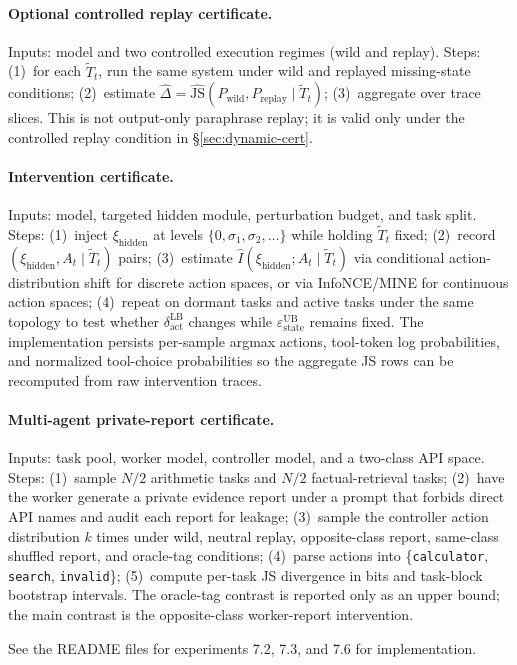   \paragraph{Optional controlled replay certificate.} Inputs: model and two
  controlled execution regimes (wild and replay). Steps: (1)~for each $\tilde
  T_t$, run the same system under wild and replayed missing-state conditions;
  (2)~estimate $\hat\Delta = \hat{\mathrm{JS}}(P_\text{wild}, P_\text{replay}
  \mid \tilde T_t)$; (3)~aggregate over trace slices. This is not output-only
  paraphrase replay; it is valid only under the controlled replay condition in
  \S\ref{sec:dynamic-cert}.

  \paragraph{Intervention certificate.} Inputs: model, targeted hidden module,
  perturbation budget, and task split. Steps: (1)~inject $\xi_\text{hidden}$ at
  levels $\{0, \sigma_1, \sigma_2, \ldots\}$ while holding $\tilde T_t$ fixed;
  (2)~record $(\xi_\text{hidden}, A_t \mid \tilde T_t)$ pairs; (3)~estimate
  $\hat I(\xi_\text{hidden}; A_t \mid \tilde T_t)$ via conditional
  action-distribution shift for discrete action spaces, or via InfoNCE/MINE for
  continuous action spaces; (4)~repeat on dormant tasks and active tasks under
  the same topology to test whether $\delta_\text{act}^\text{LB}$ changes while
  $\varepsilon_\text{state}^\text{UB}$ remains fixed. The implementation
  persists per-sample argmax actions, tool-token log probabilities, and
  normalized tool-choice probabilities so the aggregate JS rows can be
  recomputed from raw intervention traces.

  \paragraph{Multi-agent private-report certificate.} Inputs: task pool, worker
  model, controller model, and a two-class API space. Steps: (1)~sample $N/2$
  arithmetic tasks and $N/2$ factual-retrieval tasks; (2)~have the worker
  generate a private evidence report under a prompt that forbids direct API
  names and audit each report for leakage; (3)~sample the controller action
  distribution $k$ times under wild, neutral replay, opposite-class report,
  same-class shuffled report, and oracle-tag conditions; (4)~parse actions into
  \{\texttt{calculator}, \texttt{search}, \texttt{invalid}\}; (5)~compute
  per-task JS divergence in bits and task-block bootstrap intervals. The
  oracle-tag contrast is reported only as an upper bound; the main contrast is
  the opposite-class worker-report intervention.

  See the README files for experiments 7.2, 7.3, and 7.6 for implementation.
